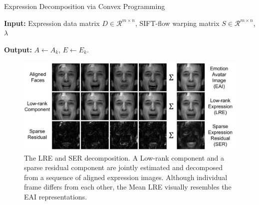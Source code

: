 \documentclass[journal]{IEEEtran}
\begin{document}
\begin{algorithm}[htb]
    \caption{Expression Decomposition via Convex Programming}
    \textbf{Input:} Expression data matrix $D\in \mathscr{R}^{m\times n}$, SIFT-flow warping matrix $S\in \mathscr{R}^{m\times n}$, $\lambda$ \\
    \begin{algorithmic}[1]
				
				
				
			\EndWhile
    \end{algorithmic}
    \textbf{Output:} $A\leftarrow A_k$, $E\leftarrow E_k$. \\
    \label{alg}
\end{algorithm}

\begin{figure}[htbp]
	\centering
		\includegraphics[width=\columnwidth]{pics/low_rank_sparse}
	\caption{The LRE and SER decomposition. A Low-rank component and a sparse residual component are jointly estimated and decomposed from a sequence of aligned expression images. Although individual frame differs from each other, the Mean LRE visually resembles the EAI representations.}
	\label{fig:low_rank_sparse}
\end{figure}
\end{document}
